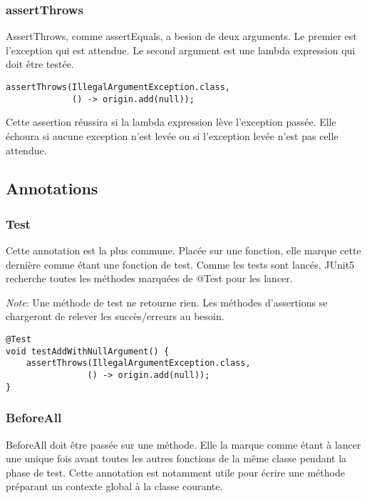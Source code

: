 \documentclass[12pt]{article}		%
\begin{document}
\subsubsection{assertThrows}

AssertThrows, comme assertEquals, a besion de deux arguments. Le premier est l'exception qui est attendue. Le second argument est une lambda expression qui doit être testée.

\lstset{language=Java, numbers=left}
\begin{lstlisting}
assertThrows(IllegalArgumentException.class,
             () -> origin.add(null));
\end{lstlisting}

Cette assertion réussira si la lambda expression lève l'exception passée. Elle échoura si aucune exception n'est levée ou si l'exception levée n'est pas celle attendue.

\subsection{Annotations}

\subsubsection{Test}

Cette annotation est la plus commune. Placée sur une fonction, elle marque cette dernière comme étant une fonction de test. Comme les tests sont lancés, JUnit5 recherche toutes les méthodes marquées de @Test pour les lancer.

\textit{Note}: Une méthode de test ne retourne rien. Les méthodes d'assertions se chargeront de relever les succès/erreurs au besoin.

\lstset{language=Java, numbers=left}
\begin{lstlisting}
@Test
void testAddWithNullArgument() {
    assertThrows(IllegalArgumentException.class,
                () -> origin.add(null));
}
\end{lstlisting}

\subsubsection{BeforeAll}

BeforeAll doit être passée sur une méthode. Elle la marque comme étant à lancer une unique fois avant toutes les autres fonctions de la même classe pendant la phase de test. Cette annotation est notamment utile pour écrire une méthode préparant un contexte global à la classe courante.
\end{document}
